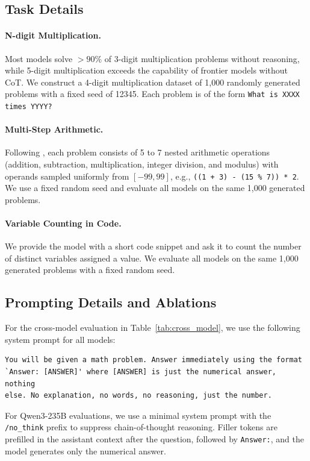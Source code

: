 \documentclass{article}
\begin{document}
\subsection{Task Details}
\label{app:task_details}

\paragraph{N-digit Multiplication.} Most models solve $>90\%$ of 3-digit multiplication problems without reasoning, while 5-digit multiplication exceeds the capability of frontier models without CoT. We construct a 4-digit multiplication dataset of 1,000 randomly generated problems with a fixed seed of 12345. Each problem is of the form \texttt{What is XXXX times YYYY?}

\paragraph{Multi-Step Arithmetic.} Following \citet{greenblatt2024counting}, each problem consists of 5 to 7 nested arithmetic operations (addition, subtraction, multiplication, integer division, and modulus) with operands sampled uniformly from $[-99, 99]$, e.g., \texttt{((1 + 3) - (15 \% 7)) * 2}. We use a fixed random seed and evaluate all models on the same 1,000 generated problems.

\paragraph{Variable Counting in Code.} We provide the model with a short code snippet and ask it to count the number of distinct variables assigned a value. We evaluate all models on the same 1,000 generated problems with a fixed random seed.

\subsection{Prompting Details and Ablations}
\label{app:prompts}

For the cross-model evaluation in Table~\ref{tab:cross_model}, we use the following system prompt for all models:
\begin{verbatim}
You will be given a math problem. Answer immediately using the format
`Answer: [ANSWER]' where [ANSWER] is just the numerical answer, nothing
else. No explanation, no words, no reasoning, just the number.
\end{verbatim}
For Qwen3-235B evaluations, we use a minimal system prompt with the \texttt{/no\_think} prefix to suppress chain-of-thought reasoning. Filler tokens are prefilled in the assistant context after the question, followed by \texttt{Answer:}, and the model generates only the numerical answer.
\end{document}
